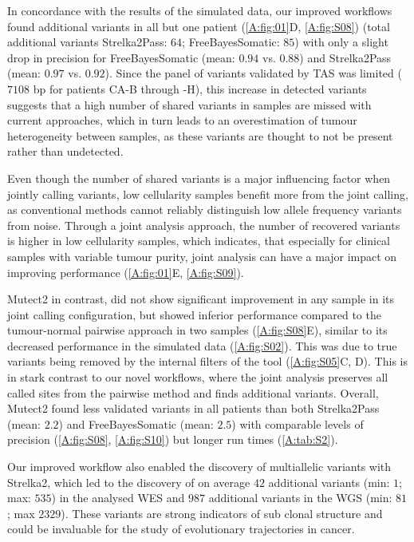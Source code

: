 In concordance with the results of the simulated data, our improved workflows found additional variants in all but one patient (\autoref{A:fig:01}D, \autoref{A:fig:S08}) (total additional variants Strelka2Pass: $64$; FreeBayesSomatic: $85$) with only a slight drop in precision for FreeBayesSomatic (mean: $0.94$ vs. $0.88$) and Strelka2Pass (mean: $0.97$ vs. $0.92$). Since the panel of variants validated by TAS was limited ($7108$ bp for patients CA-B through -H), this increase in detected variants suggests that a high number of shared variants in samples are missed with current approaches, which in turn leads to an overestimation of tumour heterogeneity between samples, as these variants are thought to not be present rather than undetected.

Even though the number of shared variants is a major influencing factor when jointly calling variants, low cellularity samples benefit more from the joint calling, as conventional methods cannot reliably distinguish low allele frequency variants from noise. Through a joint analysis approach, the number of recovered variants is higher in low cellularity samples, which indicates, that especially for clinical samples with variable tumour purity, joint analysis can have a major impact on improving performance (\autoref{A:fig:01}E, \autoref{A:fig:S09}).

Mutect2 in contrast, did not show significant improvement in any sample in its joint calling configuration, but showed inferior performance compared to the tumour-normal pairwise approach in two samples (\autoref{A:fig:S08}E), similar to its decreased performance in the simulated data (\autoref{A:fig:S02}). This was due to true variants being removed by the internal filters of the tool (\autoref{A:fig:S05}C, D). This is in stark contrast to our novel workflows, where the joint analysis preserves all called sites from the pairwise method and finds additional variants. Overall, Mutect2 found less validated variants in all patients than both Strelka2Pass (mean: $2.2$) and FreeBayesSomatic (mean: $2.5$) with comparable levels of precision (\autoref{A:fig:S08}, \autoref{A:fig:S10}) but longer run times (\autoref{A:tab:S2}).

Our improved workflow also enabled the discovery of multiallelic variants with Strelka2, which led to the discovery of on average $42$ additional variants (min: $1$; max: $535$) in the analysed WES and $987$ additional variants in the WGS (min: $81$; max $2329$). These variants are strong indicators of sub clonal structure and could be invaluable for the study of evolutionary trajectories in cancer.

